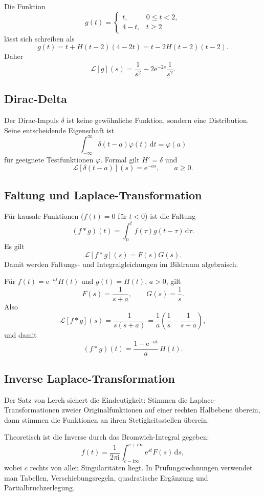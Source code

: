 \documentclass[11pt,a4paper]{article}
\newcommand{\ii}{\mathrm i}
\newcommand{\ee}{\mathrm e}
\newcommand{\dd}{\,\mathrm d}
\newcommand{\1}{\mathbf 1}
\begin{document}
{\begin{beispielbox}[title={Beispiel: Heaviside-Darstellung einer stückweisen Funktion}]
Die Funktion
\[
g(t)=
\begin{cases}
t,&0\le t<2,\\
4-t,&t\ge2
\end{cases}
\]
lässt sich schreiben als
\[
g(t)=t+H(t-2)(4-2t)
=t-2H(t-2)(t-2).
\]
Daher
\[
\mathcal L[g](s)=\frac1{s^2}-2\ee^{-2s}\frac1{s^2}.
\]
\end{beispielbox}

\subsection{Dirac-Delta}
Der Dirac-Impuls $\delta$ ist keine gewöhnliche Funktion, sondern eine Distribution.
Seine entscheidende Eigenschaft ist
\[
\int_{-\infty}^{\infty}\delta(t-a)\varphi(t)\dd t=\varphi(a)
\]
für geeignete Testfunktionen $\varphi$. Formal gilt $H'=\delta$ und
\[
\mathcal L[\delta(t-a)](s)=\ee^{-as},\qquad a\ge0.
\]

\subsection{Faltung und Laplace-Transformation}
Für kausale Funktionen ($f(t)=0$ für $t<0$) ist die Faltung
\[
(f*g)(t)=\int_0^t f(\tau)g(t-\tau)\dd\tau.
\]
Es gilt
\[
\mathcal L[f*g](s)=F(s)G(s).
\]
Damit werden Faltungs- und Integralgleichungen im Bildraum algebraisch.

\begin{beispielbox}[title={Beispiel: Faltung zweier kausaler Funktionen}]
Für $f(t)=\ee^{-at}H(t)$ und $g(t)=H(t)$, $a>0$, gilt
\[
F(s)=\frac1{s+a},\qquad G(s)=\frac1s.
\]
Also
\[
\mathcal L[f*g](s)=\frac1{s(s+a)}
=\frac1a\left(\frac1s-\frac1{s+a}\right),
\]
und damit
\[
(f*g)(t)=\frac{1-\ee^{-at}}a\,H(t).
\]
\end{beispielbox}

\subsection{Inverse Laplace-Transformation}
Der Satz von Lerch sichert die Eindeutigkeit: Stimmen die Laplace-Transformationen
zweier Originalfunktionen auf einer rechten Halbebene überein, dann stimmen die
Funktionen an ihren Stetigkeitsstellen überein.

Theoretisch ist die Inverse durch das Bromwich-Integral gegeben:
\[
f(t)=\frac1{2\pi\ii}
\int_{c-\ii\infty}^{c+\ii\infty}\ee^{st}F(s)\dd s,
\]
wobei $c$ rechts von allen Singularitäten liegt. In Prüfungsrechnungen verwendet man Tabellen, Verschiebungsregeln, quadratische Ergänzung und
Partialbruchzerlegung.

}
\end{document}
